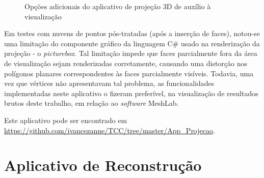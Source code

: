 		\begin{figure}[!htb]
			\centering
			\quad
			\caption{Opções adicionais do aplicativo de projeção 3D de auxílio à visualização}
			\label{imagemApp3DAuxiliosVisuais}
		\end{figure}
		
		Em testes com nuvens de pontos pós-tratadas (após a inserção de faces), notou-se uma limitação do componente gráfico da linguagem C\# usado na renderização da projeção - o \textit{picturebox}. Tal limitação impede que faces parcialmente fora da área de visualização sejam renderizadas corretamente, causando uma distorção nos polígonos planares correspondentes às faces parcialmente visíveis. Todavia, uma vez que vértices não apresentavam tal problema, as funcionalidades implementadas neste aplicativo o fizeram preferível, na visualização de resultados brutos deste trabalho, em relação ao \textit{software} MeshLab.
		
		Este aplicativo pode ser encontrado em \url{https://github.com/ivancezanne/TCC/tree/master/App_Projecao}.
		
	\section{Aplicativo de Reconstrução}
		\label{appReconstrucao}
		

